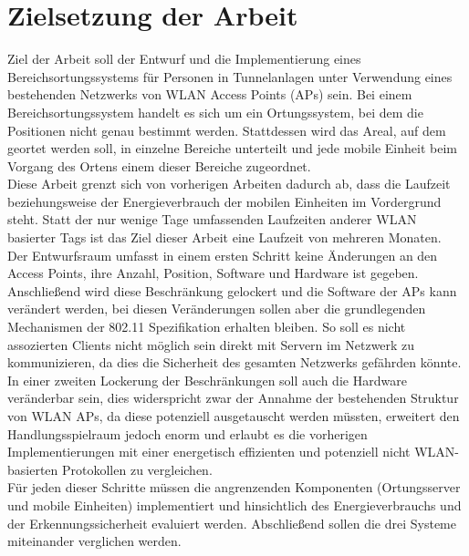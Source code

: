 \section{Zielsetzung der Arbeit}
\label{ch:Einleitung:sec:Zielsetzung}
Ziel der Arbeit soll der Entwurf und die Implementierung eines Bereichsortungssystems für Personen in Tunnelanlagen unter Verwendung eines bestehenden Netzwerks von WLAN Access Points (APs) sein. 
Bei einem Bereichsortungssystem handelt es sich um ein Ortungssystem, bei dem die Positionen nicht genau bestimmt werden. 
Stattdessen wird das Areal, auf dem geortet werden soll, in einzelne Bereiche unterteilt und jede mobile Einheit beim Vorgang des Ortens einem dieser Bereiche zugeordnet.\\
Diese Arbeit grenzt sich von vorherigen Arbeiten dadurch ab, dass die Laufzeit beziehungsweise der Energieverbrauch der mobilen Einheiten im Vordergrund steht. 
Statt der nur wenige Tage umfassenden Laufzeiten anderer WLAN basierter Tags ist das Ziel dieser Arbeit eine Laufzeit von mehreren Monaten. \\
Der Entwurfsraum umfasst in einem ersten Schritt keine Änderungen an den Access Points, ihre Anzahl, Position, Software und Hardware ist gegeben. \\ %
Anschließend wird diese Beschränkung gelockert und die Software der APs kann verändert werden, bei diesen Veränderungen sollen aber die grundlegenden Mechanismen der 802.11 Spezifikation erhalten bleiben. 
So soll es nicht assozierten Clients nicht möglich sein direkt mit Servern im Netzwerk zu kommunizieren, da dies die Sicherheit des gesamten Netzwerks gefährden könnte.\\
In einer zweiten Lockerung der Beschränkungen soll auch die Hardware veränderbar sein, dies widerspricht zwar der Annahme der bestehenden Struktur von WLAN APs, da diese potenziell ausgetauscht werden müssten, erweitert den Handlungsspielraum jedoch enorm und erlaubt es die vorherigen Implementierungen mit einer energetisch effizienten und potenziell nicht WLAN-basierten Protokollen zu vergleichen. \\
Für jeden dieser Schritte müssen die angrenzenden Komponenten (Ortungsserver und mobile Einheiten) implementiert und hinsichtlich des Energieverbrauchs und der Erkennungssicherheit evaluiert werden. Abschließend sollen die drei Systeme miteinander verglichen werden. \\



